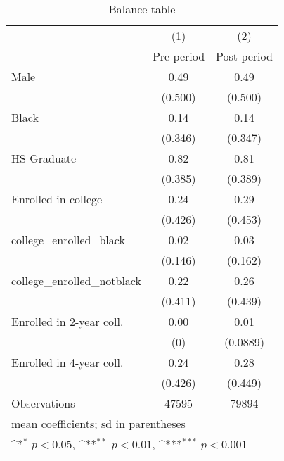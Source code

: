 \begin{table}[htbp]\centering
\def\sym#1{\ifmmode^{#1}\else\(^{#1}\)\fi}
\caption{Balance table}
\begin{tabular}{l*{2}{c}}
\hline\hline
                    &\multicolumn{1}{c}{(1)}&\multicolumn{1}{c}{(2)}\\
                    &\multicolumn{1}{c}{Pre-period}&\multicolumn{1}{c}{Post-period}\\
\hline
Male                &        0.49         &        0.49         \\
                    &     (0.500)         &     (0.500)         \\
[1em]
Black               &        0.14         &        0.14         \\
                    &     (0.346)         &     (0.347)         \\
[1em]
HS Graduate         &        0.82         &        0.81         \\
                    &     (0.385)         &     (0.389)         \\
[1em]
Enrolled in college &        0.24         &        0.29         \\
                    &     (0.426)         &     (0.453)         \\
[1em]
college\_enrolled\_black&        0.02         &        0.03         \\
                    &     (0.146)         &     (0.162)         \\
[1em]
college\_enrolled\_notblack&        0.22         &        0.26         \\
                    &     (0.411)         &     (0.439)         \\
[1em]
Enrolled in 2-year coll.&        0.00         &        0.01         \\
                    &         (0)         &    (0.0889)         \\
[1em]
Enrolled in 4-year coll.&        0.24         &        0.28         \\
                    &     (0.426)         &     (0.449)         \\
\hline
Observations        &       47595         &       79894         \\
\hline\hline
\multicolumn{3}{l}{\footnotesize mean coefficients; sd in parentheses}\\
\multicolumn{3}{l}{\footnotesize \sym{*} \(p<0.05\), \sym{**} \(p<0.01\), \sym{***} \(p<0.001\)}\\
\end{tabular}
\end{table}
